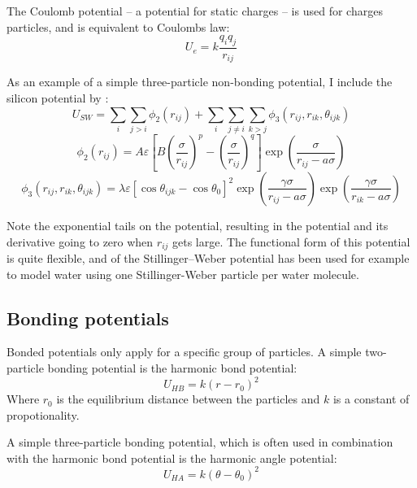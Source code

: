 The Coulomb potential -- a potential for static charges -- is used for charges particles, and is equivalent to Coulombs law:
\begin{equation}
	U_e = k\frac{q_iq_j}{r_{ij}}
\end{equation}

As an example of a simple three-particle non-bonding potential, I include the silicon potential by \citet{Stillinger1985}:
\begin{equation}
	U_{SW} = \sum_i \sum_{j>i} \phi_2(r_{ij}) + \sum_i \sum_{j\neq i} \sum_{k>j} \phi_3(r_{ij}, r_{ik}, \theta_{ijk})
\end{equation}
\begin{equation}
	\phi_2(r_{ij}) = A\varepsilon\left[ B \left( \frac{\sigma}{r_{ij}}\right)^p-\left(\frac{\sigma}{r_{ij}}\right)^q\right]\exp\left(\frac{\sigma}{r_{ij}-a\sigma}\right)
\end{equation}
\begin{equation}
	\phi_3(r_{ij}, r_{ik}, \theta_{ijk}) = \lambda\varepsilon\left[ \cos{\theta_{ijk}} - \cos{\theta_0}\right]^2 \exp\left( \frac{\gamma\sigma}{r_{ij}-a\sigma}\right) \exp\left(\frac{\gamma \sigma}{r_{ik}-a\sigma} \right)
\end{equation}

Note the exponential tails on the potential, resulting in the potential and its derivative going to zero when $r_{ij}$ gets large. The functional form of this potential is quite flexible, and of the Stillinger–Weber potential has been used for example to model water using one Stillinger-Weber particle per water molecule. 

\subsection{Bonding potentials}
Bonded potentials only apply for a specific group of particles. A simple two-particle bonding potential is the harmonic bond potential:
\begin{equation}
	U_{HB} = k(r - r_0)^2
\end{equation}
Where $r_0$ is the equilibrium distance between the particles and $k$ is a constant of propotionality.

A simple three-particle bonding potential, which is often used in combination with the harmonic bond potential is the harmonic angle potential:
\begin{equation}
	U_{HA} = k(\theta - \theta_0)^2
\end{equation}

